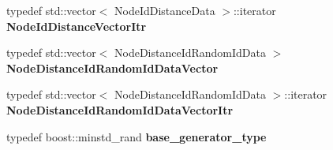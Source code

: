 \begin{DoxyCompactItemize}
\item 
\hypertarget{namespaceall__distance__sketch_aeb3aa8f88e2ff80d4625d227ad385dae}{}typedef std\+::vector$<$ Node\+Id\+Distance\+Data $>$\+::iterator {\bfseries Node\+Id\+Distance\+Vector\+Itr}\label{namespaceall__distance__sketch_aeb3aa8f88e2ff80d4625d227ad385dae}

\item 
\hypertarget{namespaceall__distance__sketch_aba91dd69245d43d635e9aa605e31d85e}{}typedef std\+::vector$<$ Node\+Distance\+Id\+Random\+Id\+Data $>$ {\bfseries Node\+Distance\+Id\+Random\+Id\+Data\+Vector}\label{namespaceall__distance__sketch_aba91dd69245d43d635e9aa605e31d85e}

\item 
\hypertarget{namespaceall__distance__sketch_ab3b8677a1a08a8cd393e4dc0cc0f90e2}{}typedef std\+::vector$<$ Node\+Distance\+Id\+Random\+Id\+Data $>$\+::iterator {\bfseries Node\+Distance\+Id\+Random\+Id\+Data\+Vector\+Itr}\label{namespaceall__distance__sketch_ab3b8677a1a08a8cd393e4dc0cc0f90e2}

\item 
\hypertarget{namespaceall__distance__sketch_afd0190bdb1b259b86910f87a565d592d}{}typedef boost\+::minstd\+\_\+rand {\bfseries base\+\_\+generator\+\_\+type}\label{namespaceall__distance__sketch_afd0190bdb1b259b86910f87a565d592d}

\end{DoxyCompactItemize}
